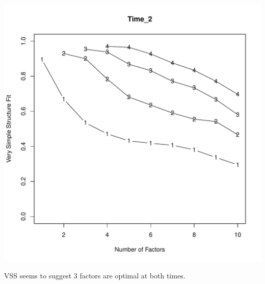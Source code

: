 \documentclass{article}\usepackage[]{graphicx}\usepackage[]{color}
\makeatletter
\def\maxwidth{ %
  \ifdim\Gin@nat@width>\linewidth
    \linewidth
  \else
    \Gin@nat@width
  \fi
}
\newenvironment{knitrout}{}{} %
\makeatother
\begin{document}
\begin{knitrout}
\includegraphics[width=\maxwidth]{figure/unnamed-chunk-6-2} 

\end{knitrout}

VSS seems to suggest 3 factors are optimal at both times.  
\end{document}
